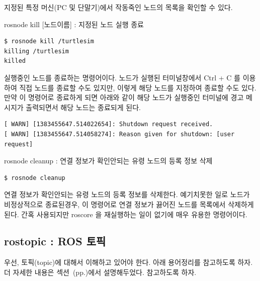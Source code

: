\vspace{\baselineskip}
\noindent
지정된 특정 머신(PC 및 단말기)에서 작동죽인 노드의 목록을 확인할 수 있다.

\vspace{\baselineskip}
\noindent
{}\circled{\thenum} rosnode kill [노드이름] : 지정된 노드 실행 종료
\begin{lstlisting}[language=ROS]
$ rosnode kill /turtlesim
killing /turtlesim
killed
\end{lstlisting}

\vspace{\baselineskip}
\noindent
실행중인 노드를 종료하는 명령어이다. 노드가 실행된 터미널창에서 Ctrl + C 를 이용하여 직접 노드를 종료할 수도 있지만, 이렇게 해당 노드를 지정하여 종료할 수도 있다. 만약 이 명령어로 종료하게 되면 아래와 같이 해당 노드가 실행중인 터미널에 경고 메시지가 출력되면서 해당 노드는 종료되게 된다.

\begin{lstlisting}[language=ROS]
[ WARN] [1383455647.514022654]: Shutdown request received.
[ WARN] [1383455647.514058274]: Reason given for shutdown: [user request]
\end{lstlisting}

\vspace{\baselineskip}
\noindent
{}\circled{\thenum} rosnode cleanup : 연결 정보가 확인안되는 유령 노드의 등록 정보 삭제
\begin{lstlisting}[language=ROS]
$ rosnode cleanup 
\end{lstlisting}

\vspace{\baselineskip}
\noindent
연결 정보가 확인안되는 유령 노드의 등록 정보를 삭제한다. 예기치못한 일로 노드가 비정상적으로 종료된경우, 이 명령어로 연결 정보가 끓어진 노드를 목록에서 삭제하게된다. 간혹 사용되지만 roscore 을 재실행하는 일이 없기에 매우 유용한 명령어이다.


\subsection{rostopic : ROS 토픽}

우선, 토픽(topic)에 대해서 이해하고 있어야 한다. 아래 용어정리를 참고하도록 하자. 더 자세한 내용은 섹션~(pp.\pageref{def:RosTopic})에서 설명해두었다. 참고하도록 하자.

